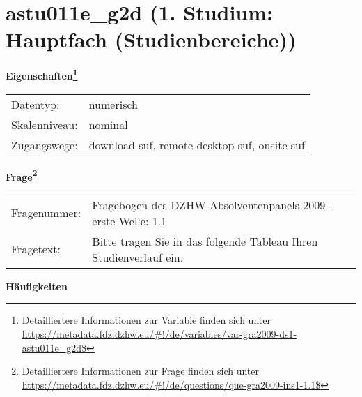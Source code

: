 
    \setcounter{footnote}{0}

    \vspace*{-1.8cm}
	\section{astu011e\_g2d (1. Studium: Hauptfach (Studienbereiche))}
	\label{section:astu011e_g2d}



    \vspace*{0.5cm}
    \noindent\textbf{Eigenschaften\footnote{Detailliertere Informationen zur Variable finden sich unter
		\url{https://metadata.fdz.dzhw.eu/\#!/de/variables/var-gra2009-ds1-astu011e_g2d$}}}\\
	\begin{tabularx}{\hsize}{@{}lX}
	Datentyp: & numerisch \\
	Skalenniveau: & nominal \\
	Zugangswege: &
	  download-suf, 
	  remote-desktop-suf, 
	  onsite-suf
 \\
    \end{tabularx}



				\vspace*{0.5cm}
                \noindent\textbf{Frage\footnote{Detailliertere Informationen zur Frage finden sich unter
		              \url{https://metadata.fdz.dzhw.eu/\#!/de/questions/que-gra2009-ins1-1.1$}}}\\
				\begin{tabularx}{\hsize}{@{}lX}
					Fragenummer: &
					  Fragebogen des DZHW-Absolventenpanels 2009 - erste Welle:
					  1.1
 \\
					Fragetext: & Bitte tragen Sie in das folgende Tableau Ihren Studienverlauf ein. \\
				\end{tabularx}





        		\vspace*{0.5cm}
                \noindent\textbf{Häufigkeiten}

